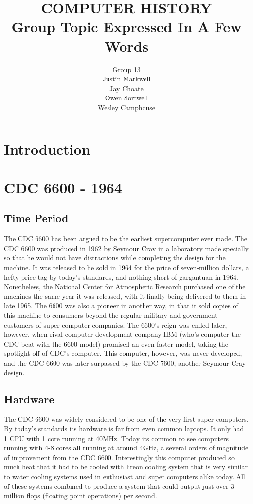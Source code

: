 \documentclass[letterpaper, 10 pt, conference]{IEEEconf}
\title{\LARGE \bf
COMPUTER HISTORY\\
\large Group Topic Expressed In A Few Words
}
\author{Group 13\\
\small Justin Markwell\\
\small Jay Choate\\
\small Owen Sortwell\\
\small Wesley Camphouse\\
}
\begin{document}
\maketitle
\thispagestyle{empty}
\pagestyle{empty}


\section{Introduction}

\section{CDC 6600 - 1964}
\subsection{Time Period}
The CDC 6600 has been argued to be the earliest supercomputer ever made. The CDC 6600 was produced in 1962 by Seymour Cray in a laboratory made specially so that he would not have distractions while completing the design for the machine. It was released to be sold in 1964 for the price of seven-million dollars, a hefty price tag by today's standards, and nothing short of gargantuan in 1964. Nonetheless, the National Center for Atmospheric Research purchased one of the machines the same year it was released, with it finally being delivered to them in late 1965. The 6600 was also a pioneer in another way, in that it sold copies of this machine to consumers beyond the regular military and government customers of super computer companies. The 6600's reign was ended later, however, when rival computer development company IBM (who's computer the CDC beat with the 6600 model) promised an even faster model, taking the spotlight off of CDC's computer. This computer, however, was never developed, and the CDC 6600 was later surpassed by the CDC 7600, another Seymour Cray design.
\subsection{Hardware}
The CDC 6600 was widely considered to be one of the very first super computers. By today's standards its hardware is far from even common laptops. It only had 1 CPU with 1 core running at 40MHz. Today its common to see computers running with 4-8 cores all running at around 4GHz, a several orders of magnitude of improvement from the CDC 6600. Interestingly this computer produced so much heat that it had to be cooled with Freon cooling system that is very similar to water cooling systems used in enthusiast and super computers alike today. All of these systems combined to produce a system that could output just over 3 million flops (floating point operations) per second.   
\end{document}
